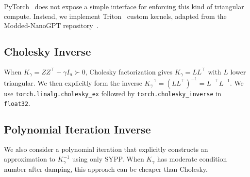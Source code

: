 \documentclass[11pt]{article}
\begin{document}
PyTorch~\citep{paszke2019pytorch} does not expose a simple interface for enforcing this kind of triangular compute. Instead, we implement Triton~\citep{tillet2019triton} custom kernels, adapted from
the Modded-NanoGPT repository~\citep{modded_nanogpt_2024}.


\subsection{Cholesky Inverse}
\label{app:chol-inverse}

When ${K}_\gamma={Z}{Z}^\top+\gamma{I}_n\succ 0$, Cholesky factorization gives
${K}_\gamma={L}{L}^\top$ with ${L}$ lower triangular. We then explicitly form the
inverse ${K}_\gamma^{-1}=({L}{L}^\top)^{-1}={L}^{-\top}{L}^{-1}$.
We use \texttt{torch.linalg.cholesky\_ex} followed by \texttt{torch.cholesky\_inverse} in \texttt{float32}.


\subsection{Polynomial Iteration Inverse}
\label{app:poly-inv}

We also consider a polynomial iteration that explicitly constructs an approximation to
${K}_\gamma^{-1}$ using only SYPP. When ${K}_\gamma$ has moderate condition number after damping, this
approach can be cheaper than Cholesky.
\end{document}

